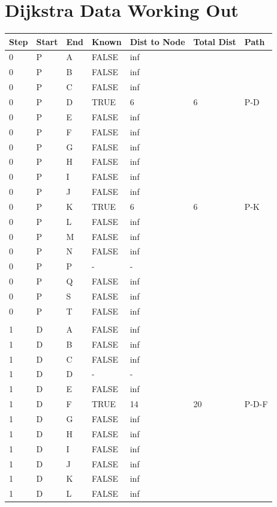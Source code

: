 \documentclass[11pt]{book}
\renewcommand{\=}[1]{\stackrel{#1}{=}} %
\theoremstyle{definition}
\theoremstyle{remark}
\begin{document}
\section{Dijkstra Data Working Out}
\begin{longtable}{lllllll}
Step & Start & End & Known & Dist to Node & Total Dist & Path \\
\endfirsthead
%
\endhead
%
0 & P & A & FALSE & inf &  &  \\
0 & P & B & FALSE & inf &  &  \\
0 & P & C & FALSE & inf &  &  \\
0 & P & D & TRUE & 6 & 6 & P-D \\
0 & P & E & FALSE & inf &  &  \\
0 & P & F & FALSE & inf &  &  \\
0 & P & G & FALSE & inf &  &  \\
0 & P & H & FALSE & inf &  &  \\
0 & P & I & FALSE & inf &  &  \\
0 & P & J & FALSE & inf &  &  \\
0 & P & K & TRUE & 6 & 6 & P-K \\
0 & P & L & FALSE & inf &  &  \\
0 & P & M & FALSE & inf &  &  \\
0 & P & N & FALSE & inf &  &  \\
0 & P & P & - & - &  &  \\
0 & P & Q & FALSE & inf &  &  \\
0 & P & S & FALSE & inf &  &  \\
0 & P & T & FALSE & inf &  &  \\
 &  &  &  &  &  &  \\
1 & D & A & FALSE & inf &  &  \\
1 & D & B & FALSE & inf &  &  \\
1 & D & C & FALSE & inf &  &  \\
1 & D & D & - & - &  &  \\
1 & D & E & FALSE & inf &  &  \\
1 & D & F & TRUE & 14 & 20 & P-D-F \\
1 & D & G & FALSE & inf &  &  \\
1 & D & H & FALSE & inf &  &  \\
1 & D & I & FALSE & inf &  &  \\
1 & D & J & FALSE & inf &  &  \\
1 & D & K & FALSE & inf &  &  \\
1 & D & L & FALSE & inf &  &  \\

\end{longtable}
\end{document}
